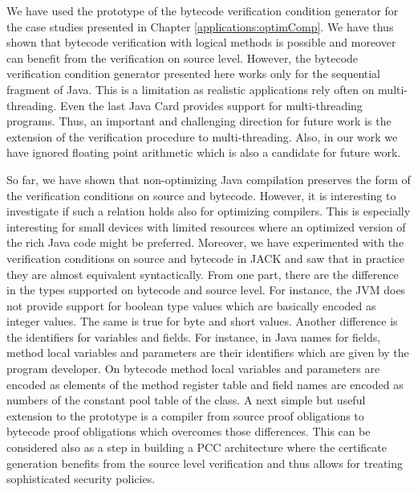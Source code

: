  We have used the prototype of the bytecode verification condition generator
 for the case studies presented in Chapter \ref{applications:optimComp}. 
 We have thus shown that bytecode verification with logical methods is possible
 and moreover can benefit from the verification on source level. 
 However, the bytecode verification condition generator presented here works only for the
 sequential fragment of Java. This is a limitation  as realistic applications  
 rely often on multi-threading. Even the last Java Card provides support for
 multi-threading programs. Thus, an important and challenging direction for future work
 is the extension of the verification procedure to multi-threading. 
 Also, in our work we have ignored floating point arithmetic which is also a
 candidate for future work.

So far, we have shown that non-optimizing Java compilation
 preserves the  form of the verification conditions on source and
 bytecode. However, it is interesting to investigate if such a relation  holds also  for
 optimizing compilers. This is especially  interesting for small devices with limited resources
  where an optimized version of the rich Java code might be preferred. 
Moreover, we have experimented with the verification conditions on source and
 bytecode in JACK and saw that in practice they are almost equivalent
 syntactically. From one part, there are the difference in the types 
 supported on bytecode and source level. For instance, the JVM does not
 provide support for boolean type values which are basically encoded as
 integer values. The same is true for byte and short values.  Another
 difference is the identifiers for variables and fields. For instance, in Java
 names for fields, method local variables and parameters are their identifiers which are given by the
 program developer. On bytecode method local variables and parameters are encoded as elements of the
 method register table and field names are encoded as numbers of the constant
 pool table of the class. A next simple but useful extension to the prototype
 is a compiler from source proof obligations to bytecode proof obligations
 which overcomes those differences. This can be considered also as a step in
 building a PCC architecture where the certificate generation benefits from
 the source level verification and thus allows for treating sophisticated
 security policies.
 

